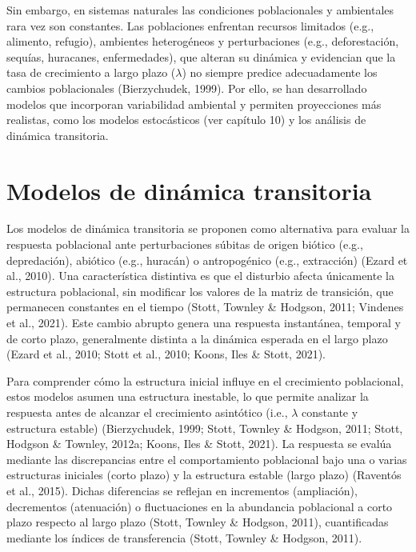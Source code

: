 \documentclass[
  12pt,
  letterpaper,
]{book}
\begin{document}
Sin embargo, en sistemas naturales las condiciones poblacionales y
ambientales rara vez son constantes. Las poblaciones enfrentan recursos
limitados (e.g., alimento, refugio), ambientes heterogéneos y
perturbaciones (e.g., deforestación, sequías, huracanes, enfermedades),
que alteran su dinámica y evidencian que la tasa de crecimiento a largo
plazo (\(λ\)) no siempre predice adecuadamente los cambios poblacionales
(Bierzychudek, 1999). Por ello, se han desarrollado modelos que
incorporan variabilidad ambiental y permiten proyecciones más realistas,
como los modelos estocásticos (ver capítulo 10) y los análisis de
dinámica transitoria.

\section{Modelos de dinámica
transitoria}\label{modelos-de-dinuxe1mica-transitoria}

Los modelos de dinámica transitoria se proponen como alternativa para
evaluar la respuesta poblacional ante perturbaciones súbitas de origen
biótico (e.g., depredación), abiótico (e.g., huracán) o antropogénico
(e.g., extracción) (Ezard et al., 2010). Una característica distintiva
es que el disturbio afecta únicamente la estructura poblacional, sin
modificar los valores de la matriz de transición, que permanecen
constantes en el tiempo (Stott, Townley \& Hodgson, 2011; Vindenes et
al., 2021). Este cambio abrupto genera una respuesta instantánea,
temporal y de corto plazo, generalmente distinta a la dinámica esperada
en el largo plazo (Ezard et al., 2010; Stott et al., 2010; Koons, Iles
\& Stott, 2021).

Para comprender cómo la estructura inicial influye en el crecimiento
poblacional, estos modelos asumen una estructura inestable, lo que
permite analizar la respuesta antes de alcanzar el crecimiento
asintótico (i.e., \(λ\) constante y estructura estable) (Bierzychudek,
1999; Stott, Townley \& Hodgson, 2011; Stott, Hodgson \& Townley, 2012a;
Koons, Iles \& Stott, 2021). La respuesta se evalúa mediante las
discrepancias entre el comportamiento poblacional bajo una o varias
estructuras iniciales (corto plazo) y la estructura estable (largo
plazo) (Raventós et al., 2015). Dichas diferencias se reflejan en
incrementos (ampliación), decrementos (atenuación) o fluctuaciones en la
abundancia poblacional a corto plazo respecto al largo plazo (Stott,
Townley \& Hodgson, 2011), cuantificadas mediante los índices de
transferencia (Stott, Townley \& Hodgson, 2011).
\end{document}
